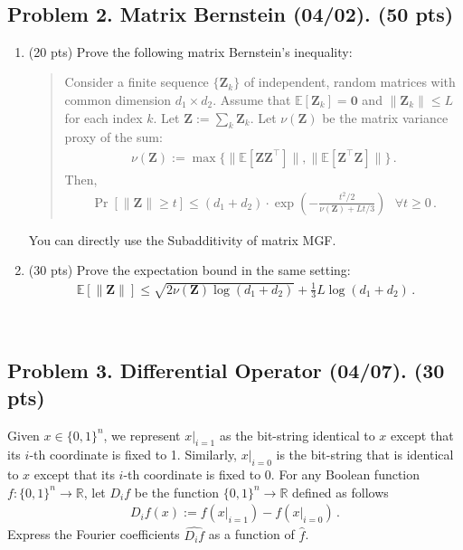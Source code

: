 \documentclass[12pt]{article}
\theoremstyle{plain}
\theoremstyle{definition}
\newcommand{\R}{\mathbb{R}}
\newcommand{\mat}[1]{\mathbf{#1}}
\begin{document}
 \newline
\   %
\newpage

\subsection*{Problem 2. Matrix Bernstein (04/02). (50 pts)}
\begin{enumerate}
\item (20 pts) Prove the following matrix Bernstein's inequality:
\begin{quote}
    Consider a finite sequence $\{\mat{Z}_k\}$ of independent, random matrices with common dimension $d_1\times d_2$. Assume that $\mathbb{E}[\mat{Z}_k]= \mat{0}$ and $\|\mat{Z}_k\|\leq L$ for each index $k$. Let $\mat{Z} :=\sum_k \mat{Z}_k$. Let $\nu(\mat{Z})$ be the matrix variance proxy of the sum:
    \begin{align*}
        \nu(\mat{Z}):=\max\{\|\mathbb{E}[\mat{Z}\mat{Z}^\top]\|,\|\mathbb{E}[\mat{Z}^\top \mat{Z}]\|\}\,.
    \end{align*}
    Then, 
    \begin{align*}
        \Pr[\|\mat{Z}\|\geq t]\leq (d_1 + d_2)\cdot \exp\left(-\frac{t^2/2}{\nu(\mat{Z})+Lt/3}\right)~~~\forall t\geq 0\,.
    \end{align*}
\end{quote}
You can directly use the Subadditivity of matrix MGF.
    \item (30 pts) Prove the expectation bound in the same setting:
        \begin{align*}
            \mathbb{E}[\|\mat{Z}\|]\leq \sqrt{2\nu(\mat{Z})\log (d_1 + d_2)} + \frac{1}{3}L \log (d_1 + d_2)\,.
        \end{align*}
\end{enumerate}

 \newline
\   %
\newpage

\subsection*{Problem 3. Differential Operator (04/07). (30 pts)}
Given $x\in \{0,1\}^n$, we represent $x|_{i=1}$ as the bit-string identical to $x$ except
that its $i$-th coordinate is fixed to 1. Similarly, $x|_{i=0}$ is the bit-string that is identical to $x$ except that its $i$-th coordinate is fixed to 0. For any Boolean function $f:\{0,1\}^n\rightarrow \R$, let $D_if$ be the function $\{0, 1\}^n\rightarrow \R$ defined as follows 
\begin{align*}
    D_i f (x):=f(x|_{i=1}) - f(x|_{i=0})\,.
\end{align*}
Express the Fourier coefficients $\widehat{D_if}$ as a function of $\widehat{f}$.
\end{document}
